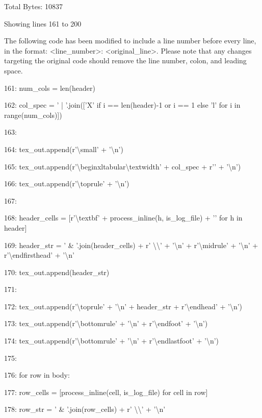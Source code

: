 \documentclass[11pt,a4paper]{article}
\begin{document}
Total Bytes: 10837

Showing lines 161 to 200

The following code has been modified to include a line number before every line, in the format: <line\_number>: <original\_line>. Please note that any changes targeting the original code should remove the line number, colon, and leading space.

161:                 num\_cols = len(header)

162:                 col\_spec = ' | '.join(['X' if i == len(header)-1 or i == 1 else 'l' for i in range(num\_cols)])

163:

164:                 tex\_out.append(r'\textbackslash{}small' + '\textbackslash{}n')

165:                 tex\_out.append(r'\textbackslash{}begin{xltabular}{\textbackslash{}textwidth}{' + col\_spec + r'}' + '\textbackslash{}n')

166:                 tex\_out.append(r'\textbackslash{}toprule' + '\textbackslash{}n')

167:

168:                 header\_cells = [r'\textbackslash{}textbf{' + process\_inline(h, is\_log\_file) + '}' for h in header]

169:                 header\_str = ' \& '.join(header\_cells) + r' \textbackslash{}\textbackslash{}' + '\textbackslash{}n' + r'\textbackslash{}midrule' + '\textbackslash{}n' + r'\textbackslash{}endfirsthead' + '\textbackslash{}n'

170:                 tex\_out.append(header\_str)

171:

172:                 tex\_out.append(r'\textbackslash{}toprule' + '\textbackslash{}n' + header\_str + r'\textbackslash{}endhead' + '\textbackslash{}n')

173:                 tex\_out.append(r'\textbackslash{}bottomrule' + '\textbackslash{}n' + r'\textbackslash{}endfoot' + '\textbackslash{}n')

174:                 tex\_out.append(r'\textbackslash{}bottomrule' + '\textbackslash{}n' + r'\textbackslash{}endlastfoot' + '\textbackslash{}n')

175:

176:                 for row in body:

177:                     row\_cells = [process\_inline(cell, is\_log\_file) for cell in row]

178:                     row\_str = ' \& '.join(row\_cells) + r' \textbackslash{}\textbackslash{}' + '\textbackslash{}n'
\end{document}
